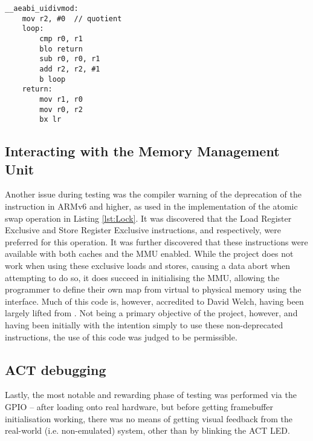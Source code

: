     \lstset{language=c}
    \begin{lstlisting}[caption={Implementation of unsigned integer division and
    modulo in ARM assembly},captionpos=b,label={lst:uidiv}]
__aeabi_uidivmod:
    mov r2, #0  // quotient
    loop:
        cmp r0, r1
        blo return
        sub r0, r0, r1
        add r2, r2, #1
        b loop
    return:
        mov r1, r0
        mov r0, r2
        bx lr
    \end{lstlisting}

\subsection{Interacting with the Memory Management Unit}
    Another issue during testing was the compiler warning of the deprecation of
    the  instruction in ARMv6 and higher, as used in the
    implementation of the atomic swap operation in Listing \ref{lst:Lock}. It
    was discovered that the Load Register Exclusive and Store Register Exclusive
    instructions,  and  respectively, were preferred for
    this operation. It was further discovered \cite{CacheEnable} that these instructions were
    available with both caches and the MMU enabled. While the project does not
    work when using these exclusive loads and stores, causing a data abort when
    attempting to do so, it does succeed in initialising the MMU, allowing the
    programmer to define their own map from virtual to physical memory using the
     interface. Much of this code is, however, accredited
    to David Welch, having been largely lifted from \cite{dwelch67}. Not being a
    primary objective of the project, however, and having been initially with
    the intention simply to use these non-deprecated instructions, the use of
    this code was judged to be permissible.

\subsection{ACT debugging}
    Lastly, the most notable and rewarding phase of testing was performed via
    the GPIO -- after loading onto real hardware, but before getting framebuffer
    initialisation working, there was no means of getting visual feedback from
    the real-world (i.e. non-emulated) system, other than by blinking the ACT
    LED. 
